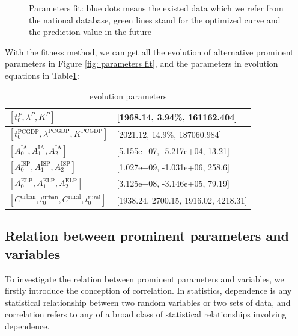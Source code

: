\begin{figure}[!h]
\begin{center}
    \end{center}
    \caption{Parameters fit: blue dots means the existed data which we refer from the national database, green lines stand for the optimized curve and the prediction value in the future }
    \end{figure}

    With the fitness method, we can get all the evolution of alternative prominent parameters in Figure \ref{fig: parameters fit}, and the parameters in evolution equations in Table\ref{tab:evolution par}:
    \begin{table}[!h]
      \label{tab:evolution par}
      \centering
      \begin{tabular}{|l|l|}
      \hline
      $\left[t_0^P, \lambda^P,K^P\right]$ & [1968.14, 3.94\%, 161162.404] \\
      \hline
      $\left[t_0^\text{PCGDP}, \lambda^\text{PCGDP},K^\text{PCGDP}\right]$ & [2021.12, 14.9\%, 187060.984] \\
      \hline
      $\left[A_0^\text{IA},A_1^\text{IA},A_2^\text{IA}\right]$ & [5.155e+07, -5.217e+04, 13.21] \\
      \hline
      $\left[A_0^\text{ISP},A_1^\text{ISP},A_2^\text{ISP}\right]$ & [1.027e+09, -1.031e+06, 258.6] \\
      \hline
      $\left[A_0^\text{ELP},A_1^\text{ELP},A_2^\text{ELP}\right]$ & [3.125e+08, -3.146e+05, 79.19] \\
      \hline
      $\left[C^\text{urban},t_0^\text{urban},C^\text{rural},t_0^\text{rural}\right]$ & [1938.24, 2700.15, 1916.02, 4218.31] \\
      \hline
      \end{tabular}
      \caption{evolution parameters}
    \end{table}


  \subsection{Relation between prominent parameters and variables}
    To investigate the relation between prominent parameters and variables, we firstly introduce the conception of  correlation. In statistics, dependence is any statistical relationship between two random variables or two sets of data, and correlation refers to any of a broad class of statistical relationships involving dependence.


